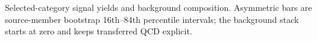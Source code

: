 Selected-category signal yields and background composition. Asymmetric bars are source-member bootstrap 16th--84th percentile intervals; the background stack starts at zero and keeps transferred QCD explicit.
